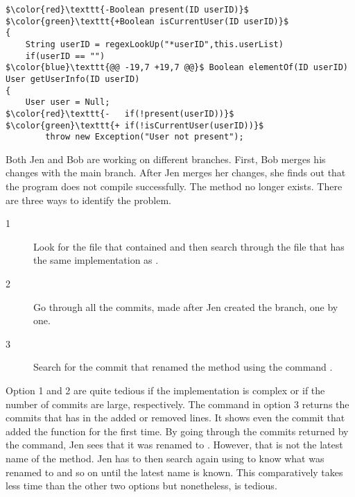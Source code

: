 \begin{lstlisting}[caption= Renamed to \ttf{isCurrentUser}, label=lst:scr3, gobble=0, basicstyle=\ttfamily\small]
$\color{red}\texttt{-Boolean present(ID userID)}$
$\color{green}\texttt{+Boolean isCurrentUser(ID userID)}$
{
	String userID = regexLookUp("*userID",this.userList)
	if(userID == "")
$\color{blue}\texttt{@@ -19,7 +19,7 @@}$ Boolean elementOf(ID userID)
User getUserInfo(ID userID)
{
	User user = Null;
$\color{red}\texttt{-	if(!present(userID))}$
$\color{green}\texttt{+	if(!isCurrentUser(userID))}$
		throw new Exception("User not present");
\end{lstlisting}


Both Jen and Bob are working on different branches. First, Bob merges his changes with the main branch. After Jen merges her changes, she finds out that the program does not compile successfully. The method  no longer exists. There are three ways to identify the problem.
\begin{description}
\item[1] Look for the file that contained  and then search through the file that has the same implementation as .
\item[2] Go through all the commits, made after Jen created the branch, one by one.
\item[3] Search for the commit that renamed the method using the command . 
\end{description}

Option 1 and 2 are quite tedious if the implementation is complex or if the number of commits are large, respectively. The command in option 3 returns the commits that has  in the added or removed lines. It shows even the commit that added the function for the first time. By going through the commits returned by the command, Jen sees that it was renamed to . However, that is not the latest name of the method. Jen has to then search again using  to know what  was renamed to and so on until the latest name is known. This comparatively takes less time than the other two options but nonetheless, is tedious.

